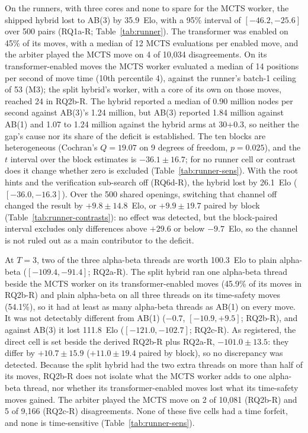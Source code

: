 \documentclass{article}
\begin{document}
On the runners, with three cores and none to spare for the MCTS worker, the shipped hybrid lost to AB(3) by 35.9~Elo, with a 95\% interval of $[-46.2, -25.6]$ over 500 pairs (RQ1a-R; Table~\ref{tab:runner}). The transformer was enabled on 45\% of its moves, with a median of 12 MCTS evaluations per enabled move, and the arbiter played the MCTS move on 4 of 10{,}034 disagreements. On its transformer-enabled moves the MCTS worker evaluated a median of 14 positions per second of move time (10th percentile 4), against the runner's batch-1 ceiling of 53 (M3); the split hybrid's worker, with a core of its own on those moves, reached 24 in RQ2b-R. The hybrid reported a median of 0.90 million nodes per second against AB(3)'s 1.24 million, but AB(3) reported 1.84 million against AB(1) and 1.07 to 1.24 million against the hybrid arms at 30+0.3, so neither the gap's cause nor its share of the deficit is established. The ten blocks are heterogeneous (Cochran's $Q = 19.07$ on 9 degrees of freedom, $p = 0.025$), and the $t$ interval over the block estimates is $-36.1 \pm 16.7$; for no runner cell or contrast does it change whether zero is excluded (Table~\ref{tab:runner-sens}). With the root hints and the verification sub-search off (RQ6d-R), the hybrid lost by 26.1~Elo ($[-36.0, -16.3]$). Over the 500 shared openings, switching that channel off changed the result by $+9.8 \pm 14.8$~Elo, or $+9.9 \pm 19.7$ paired by block (Table~\ref{tab:runner-contrasts}): no effect was detected, but the block-paired interval excludes only differences above $+29.6$ or below $-9.7$~Elo, so the channel is not ruled out as a main contributor to the deficit.

At $T = 3$, two of the three alpha-beta threads are worth 100.3~Elo to plain alpha-beta
($[-109.4, -91.4]$; RQ2a-R). The split hybrid ran one alpha-beta thread beside the MCTS worker on its
transformer-enabled moves (45.9\% of its moves in RQ2b-R) and plain alpha-beta on all three threads on
its time-safety moves (54.1\%), so it had at least as many alpha-beta threads as AB(1) on every move. It
was not detectably different from AB(1) ($-0.7$, $[-10.9, +9.5]$; RQ2b-R), and against AB(3) it lost
111.8~Elo ($[-121.0, -102.7]$; RQ2c-R). As registered, the direct cell is set beside the derived
RQ2b-R plus RQ2a-R, $-101.0 \pm 13.5$: they differ by $+10.7 \pm 15.9$ ($+11.0 \pm 19.4$ paired by block), so no discrepancy was detected.
Because the split hybrid had the two extra threads on more than half of its moves, RQ2b-R does not isolate what the MCTS worker adds to one alpha-beta thread, nor whether its transformer-enabled moves lost what its time-safety moves gained. The arbiter played the
MCTS move on 2 of 10{,}081 (RQ2b-R) and 5 of 9{,}166 (RQ2c-R) disagreements. None of these five
cells had a time forfeit, and none is time-sensitive (Table~\ref{tab:runner-sens}).
\end{document}
